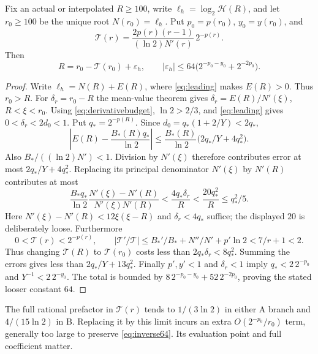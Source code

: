 \begin{theorem}\label{thm:inverse}
Fix an actual or interpolated $R\ge100$, write
$\ell_h=\log_2\mathcal H(R)$, and let $r_0\ge100$ be the
unique root $N(r_0)=\ell_h$. Put $p_0=p(r_0)$, $y_0=y(r_0)$,
and
\[
 \mathcal T(r)=\frac{2p(r)(r-1)}{(\ln2)N'(r)}\,2^{-p(r)}.
\]
Then
\begin{equation}\label{eq:inverse64}
 R=r_0-\mathcal T(r_0)+\varepsilon_h,\qquad
 |\varepsilon_h|\le64\bigl(2^{-p_0-y_0}+2^{-2p_0}\bigr).
\end{equation}
\end{theorem}
\begin{proof}
Write $\ell_h=N(R)+E(R)$, where \eqref{eq:leading} makes
$E(R)>0$. Thus $r_0>R$. For $\delta_r=r_0-R$ the mean-value
theorem gives $\delta_r=E(R)/N'(\xi)$, $R<\xi<r_0$.
Using \eqref{eq:derivativebudget}, $\ln2>2/3$, and
\eqref{eq:leading} gives $0<\delta_r<2d_0<1$.
Put $q_*=2^{-p(R)}$. Since $d_0=q_*(1+2/Y)<2q_*$,
\[
 \left|E(R)-\frac{B_*(R)q_*}{\ln2}\right|
 \le\frac{B_*(R)}{\ln2}\bigl(2q_*/Y+4q_*^2\bigr).
\]
Also $B_*/((\ln2)N')<1$. Division by $N'(\xi)$ therefore
contributes error at most $2q_*/Y+4q_*^2$.
Replacing its principal denominator $N'(\xi)$ by $N'(R)$
contributes at most
\[
 \frac{B_*q_*}{\ln2}
 \frac{N'(\xi)-N'(R)}{N'(\xi)N'(R)}
 <\frac{4q_*\delta_r}{R}<\frac{20q_*^2}{R}\le q_*^2/5.
\]
Here $N'(\xi)-N'(R)<12\xi(\xi-R)$ and
$\delta_r<4q_*$ suffice; the displayed $20$ is deliberately loose.
Furthermore
\[
 0<\mathcal T(r)<2^{-p(r)},\qquad
 |\mathcal T'/\mathcal T|
 \le B_*'/B_*+N''/N'+p'\ln2<7/r+1<2.
\]
Thus changing $\mathcal T(R)$ to $\mathcal T(r_0)$ costs less
than $2q_*\delta_r<8q_*^2$. Summing the errors gives less than
$2q_*/Y+13q_*^2$.
Finally $p',y'<1$ and $\delta_r<1$ imply
$q_*<2\,2^{-p_0}$ and $Y^{-1}<2\,2^{-y_0}$.
The total is bounded by
$8\,2^{-p_0-y_0}+52\,2^{-2p_0}$, proving the stated looser
constant $64$.
\end{proof}

The full rational prefactor in $\mathcal T(r)$ tends to
$1/(3\ln2)$ in either A branch and $4/(15\ln2)$ in B.
Replacing it by this limit incurs an extra
$O(2^{-p_0}/r_0)$ term, generally too large to preserve
\eqref{eq:inverse64}. Its evaluation point and full coefficient matter.

